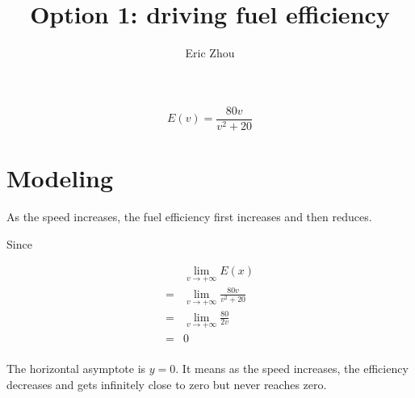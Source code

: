 \documentclass[12pt]{article}
\title{\textbf{Option 1: driving fuel efficiency}}
\author{Eric Zhou}
\begin{document}
\maketitle

\begin{equation*}
    E(v) = \frac{80v}{v^2 + 20}
\end{equation*}



\section{Modeling}

As the speed increases, the fuel efficiency first increases and then reduces.

Since

\begin{equation*}
    \begin{aligned}
        & \lim_{v\rightarrow +\infty} E(x)  \\
       =& \lim_{v\rightarrow +\infty} \frac{80v}{v^2 + 20} \\
       =& \lim_{v\rightarrow +\infty} \frac{80}{2v} \\
       =& 0 \\
    \end{aligned}
\end{equation*}

The horizontal asymptote is $y = 0$. It means as the speed increases, the efficiency decreases and gets infinitely close to zero but never reaches zero.

\end{document}
